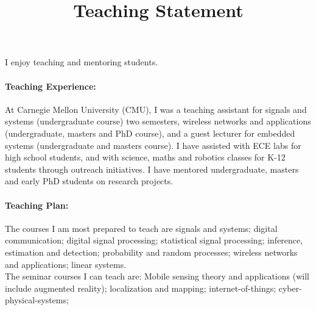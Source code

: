 \documentclass[10pt]{article}
\date{}
\begin{document}


\title{{\Large Teaching Statement}}
\vspace{-1em}
\maketitle

\vspace{-6em}

I enjoy teaching and mentoring students. \\

\paragraph{Teaching Experience:}
At Carnegie Mellon University (CMU), I was a teaching assistant for signals and systems (undergraduate course) two semesters, wireless networks and applications (undergraduate, masters and PhD course), and a guest lecturer for embedded systems (undergraduate and masters course). I have assisted with ECE labs for high school students, and with science, maths and robotics classes for K-12 students through outreach initiatives. I have mentored undergraduate, masters and early PhD students on research projects.  \\

\paragraph{Teaching Plan:}
The courses I am most prepared to teach are signals and systems; digital communication; digital signal processing; statistical signal processing; inference, estimation and detection; probability and random processes; wireless networks and applications; linear systems. \\

The seminar courses I can teach are: Mobile sensing theory and applications (will include augmented reality); localization and mapping; internet-of-things; cyber-physical-systems; \\%
\end{document}
